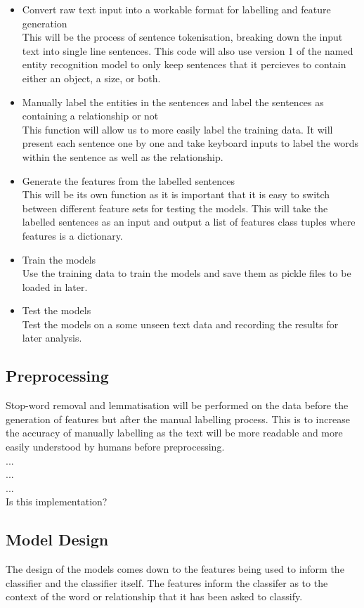 \documentclass[11pt,oneside]{book}
\begin{document}
\begin{itemize}
\item Convert raw text input into a workable format for labelling and feature generation \\
This will be the process of sentence tokenisation, breaking down the input text into single line sentences. This code will also use version 1 of the named entity recognition model to only keep sentences that it percieves to contain either an object, a size, or both.
\item Manually label the entities in the sentences and label the sentences as containing a relationship or not \\
This function will allow us to more easily label the training data. It will present each sentence one by one and take keyboard inputs to label the words within the sentence as well as the relationship.
\item Generate the features from the labelled sentences \\
This will be its own function as it is important that it is easy to switch between different feature sets for testing the models. This will take the labelled sentences as an input and output a list of features class tuples where features is a dictionary.
\item Train the models \\
Use the training data to train the models and save them as pickle files to be loaded in later.
\item Test the models \\
Test the models on a some unseen text data and recording the results for later analysis.
\end{itemize}

\subsection{Preprocessing}
Stop-word removal and lemmatisation will be performed on the data before the generation of features but after the manual labelling process. This is to increase the accuracy of manually labelling as the text will be more readable and more easily understood by humans before preprocessing.  \\ ... \\ ... \\ ... \\ Is this implementation?

\subsection{Model Design}
The design of the models comes down to the features being used to inform the classifier and the classifier itself. The features inform the classifer as to the context of the word or relationship that it has been asked to classify.
\end{document}
